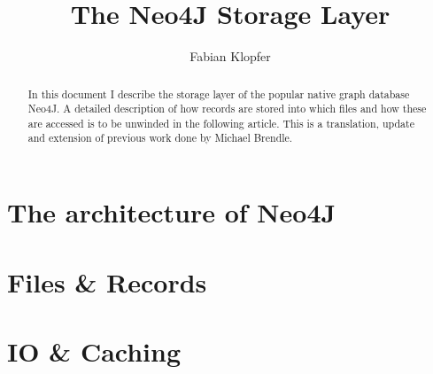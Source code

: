 \documentclass[a4paper,10pt]{article}
\title{The Neo4J Storage Layer}
\author{Fabian Klopfer}
\begin{document}
\maketitle

\begin{abstract}
In this document I describe the storage layer of the popular native graph database Neo4J. A detailed description of how records are stored into which files and how these are accessed is to be unwinded in the following article. This is a translation, update and extension of previous work done by Michael Brendle. 
\end{abstract}

\section{The architecture of Neo4J}

\section{Files \& Records}

\section{IO \& Caching}
\end{document}

